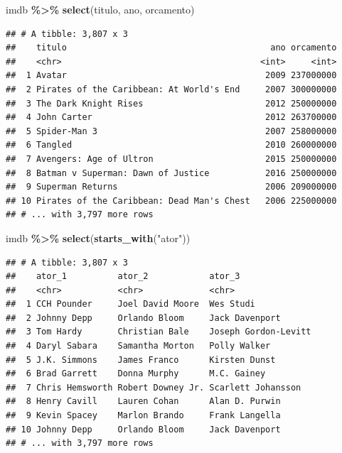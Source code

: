 \documentclass[
]{book}
\newenvironment{Shaded}{\begin{snugshade}}{\end{snugshade}}
\newcommand{\KeywordTok}[1]{\textcolor[rgb]{0.13,0.29,0.53}{\textbf{#1}}}
\newcommand{\NormalTok}[1]{#1}
\newcommand{\OperatorTok}[1]{\textcolor[rgb]{0.81,0.36,0.00}{\textbf{#1}}}
\newcommand{\StringTok}[1]{\textcolor[rgb]{0.31,0.60,0.02}{#1}}
\begin{document}
\begin{Shaded}
\begin{Highlighting}[]
\NormalTok{imdb }\OperatorTok{\%>\%}
\StringTok{  }\KeywordTok{select}\NormalTok{(titulo, ano, orcamento)}
\end{Highlighting}
\end{Shaded}

\begin{verbatim}
## # A tibble: 3,807 x 3
##    titulo                                        ano orcamento
##    <chr>                                       <int>     <int>
##  1 Avatar                                       2009 237000000
##  2 Pirates of the Caribbean: At World's End     2007 300000000
##  3 The Dark Knight Rises                        2012 250000000
##  4 John Carter                                  2012 263700000
##  5 Spider-Man 3                                 2007 258000000
##  6 Tangled                                      2010 260000000
##  7 Avengers: Age of Ultron                      2015 250000000
##  8 Batman v Superman: Dawn of Justice           2016 250000000
##  9 Superman Returns                             2006 209000000
## 10 Pirates of the Caribbean: Dead Man's Chest   2006 225000000
## # ... with 3,797 more rows
\end{verbatim}

\begin{Shaded}
\begin{Highlighting}[]
\NormalTok{imdb }\OperatorTok{\%>\%}
\StringTok{  }\KeywordTok{select}\NormalTok{(}\KeywordTok{starts\_with}\NormalTok{(}\StringTok{"ator"}\NormalTok{))}
\end{Highlighting}
\end{Shaded}

\begin{verbatim}
## # A tibble: 3,807 x 3
##    ator_1          ator_2            ator_3              
##    <chr>           <chr>             <chr>               
##  1 CCH Pounder     Joel David Moore  Wes Studi           
##  2 Johnny Depp     Orlando Bloom     Jack Davenport      
##  3 Tom Hardy       Christian Bale    Joseph Gordon-Levitt
##  4 Daryl Sabara    Samantha Morton   Polly Walker        
##  5 J.K. Simmons    James Franco      Kirsten Dunst       
##  6 Brad Garrett    Donna Murphy      M.C. Gainey         
##  7 Chris Hemsworth Robert Downey Jr. Scarlett Johansson  
##  8 Henry Cavill    Lauren Cohan      Alan D. Purwin      
##  9 Kevin Spacey    Marlon Brando     Frank Langella      
## 10 Johnny Depp     Orlando Bloom     Jack Davenport      
## # ... with 3,797 more rows
\end{verbatim}
\end{document}
